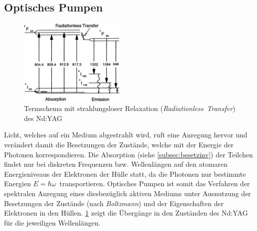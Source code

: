 \documentclass[numbers=noenddot,12pt,a4paper]{scrartcl}
\newcommand{\tilt}[1]{\mbox{\textit{#1}}}
\begin{document}
\subsection{Optisches Pumpen}\label{subsec:optpump}
\begin{figure}
	\vspace{-0.75cm}
	\includegraphics[width=0.45\textwidth]{uebergaenge.png}
	\caption{Termschema mit strahlungsloser Relaxation (\tilt{Radiationless Transfer}) des Nd:YAG}\label{img:übergänge}
\end{figure}
Licht, welches auf ein Medium abgestrahlt wird, ruft eine Anregung hervor und verändert damit die Besetzungen der Zustände, welche mit der Energie der Photonen korrespondieren. Die Absorption (siehe \ref{subsec:besetzinv}) der Teilchen findet nur bei diskreten Frequenzen bzw. Wellenlängen auf den atomaren Energieniveaus der Elektronen der Hülle statt, da die Photonen nur bestimmte Energien $E=\hbar\omega\,$ transportieren. Optisches Pumpen ist somit das Verfahren der spektralen Anregung eines diesbezüglich aktiven Mediums unter Ausnutzung der Besetzungen der Zustände (nach \tilt{Boltzmann}) und der Eigenschaften der Elektronen in den Hüllen. \ref{img:übergänge} zeigt die Übergänge in den Zuständen des Nd:YAG für die jeweiligen Wellenlängen.
\end{document}

